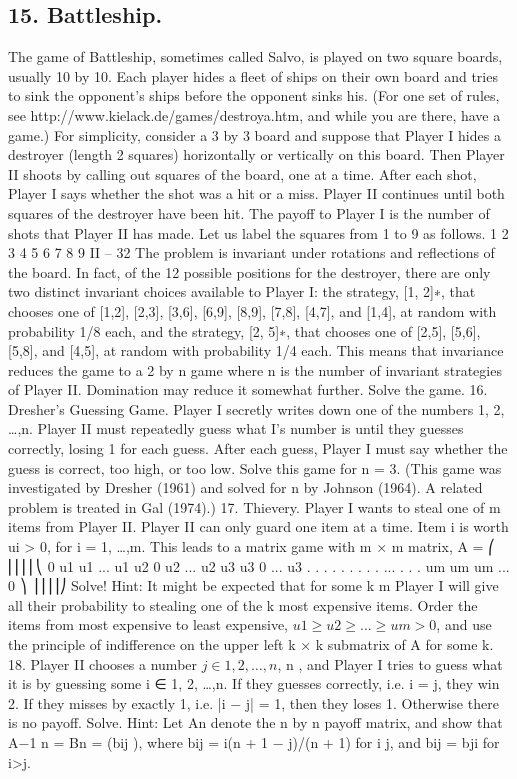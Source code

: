 \documentclass[]{report}
\begin{document}
\subsection{15. Battleship.}
The game of Battleship, sometimes called Salvo, is played on two
square boards, usually 10 by 10. Each player hides a fleet of ships on their own board and
tries to sink the opponent’s ships before the opponent sinks his. (For one set of rules, see
http://www.kielack.de/games/destroya.htm, and while you are there, have a game.)
For simplicity, consider a 3 by 3 board and suppose that Player I hides a destroyer
(length 2 squares) horizontally or vertically on this board. Then Player II shoots by calling
out squares of the board, one at a time. After each shot, Player I says whether the shot
was a hit or a miss. Player II continues until both squares of the destroyer have been hit.
The payoff to Player I is the number of shots that Player II has made. Let us label the
squares from 1 to 9 as follows.
1 2 3
4 5 6
7 8 9
II – 32
The problem is invariant under rotations and reflections of the board. In fact, of
the 12 possible positions for the destroyer, there are only two distinct invariant choices
available to Player I: the strategy, [1, 2]∗, that chooses one of [1,2], [2,3], [3,6], [6,9], [8,9],
[7,8], [4,7], and [1,4], at random with probability 1/8 each, and the strategy, [2, 5]∗, that
chooses one of [2,5], [5,6], [5,8], and [4,5], at random with probability 1/4 each. This means
that invariance reduces the game to a 2 by n game where n is the number of invariant
strategies of Player II. Domination may reduce it somewhat further. Solve the game.
16. Dresher’s Guessing Game. Player I secretly writes down one of the numbers
1, 2, \ldots,n. Player II must repeatedly guess what I’s number is until they guesses correctly,
losing 1 for each guess. After each guess, Player I must say whether the guess is correct,
too high, or too low. Solve this game for n = 3. (This game was investigated by Dresher
(1961) and solved for n  by Johnson (1964). A related problem is treated in Gal
(1974).)
17. Thievery. Player I wants to steal one of m  items from Player II. Player II
can only guard one item at a time. Item i is worth ui > 0, for i = 1, \ldots,m. This leads to
a matrix game with m × m matrix,
A =
⎛
⎜⎜⎜⎜⎝
0 u1 u1 ... u1
u2 0 u2 ... u2
u3 u3 0 ... u3
.
.
. .
.
. .
.
. ... .
.
.
um um um ... 0
⎞
⎟⎟⎟⎟⎠
Solve!
Hint: It might be expected that for some k \leq m Player I will give all their probability
to stealing one of the k most expensive items. Order the items from most expensive to
least expensive, $u1 \geq u2 \geq ... \geq um > 0$, and use the principle of indifference on the upper
left k × k submatrix of A for some k.
18. Player II chooses a number $j \in {1, 2,\ldots,n}$, n , and Player I tries to guess
what it is by guessing some i ∈ {1, 2, \ldots,n}. If they guesses correctly, i.e. i = j, they win  2.
If they misses by exactly 1, i.e. |i − j| = 1, then they loses 1. Otherwise there is no payoff.
Solve. Hint: Let An denote the n by n payoff matrix, and show that A−1 n = Bn = (bij ),
where bij = i(n + 1 − j)/(n + 1) for i \leq j, and bij = bji for i>j.
\end{document}

